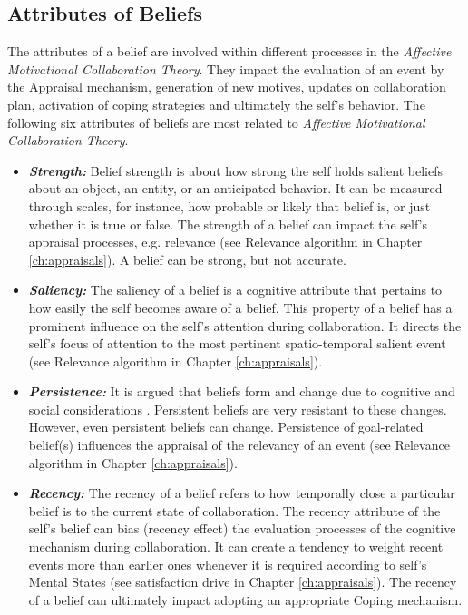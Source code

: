 \documentclass[12pt]{report}
\begin{document}
\subsection{Attributes of Beliefs}

The attributes of a belief are involved within different processes in the
\textit{Affective Motivational Collaboration Theory}. They impact the evaluation
of an event by the Appraisal mechanism, generation of new motives, updates on
collaboration plan, activation of coping strategies and ultimately the self's
behavior. The following six attributes of beliefs are most related to
\textit{Affective Motivational Collaboration Theory}.

\begin{itemize}
  \item \textbf{\textit{Strength:}} Belief strength is about how strong the self
  holds salient beliefs about an object, an entity, or an anticipated behavior.
  It can be measured through scales, for instance, how probable or likely that
  belief is, or just whether it is true or false. The strength of a belief can
  impact the self's appraisal processes, e.g. relevance (see Relevance algorithm
  in Chapter \ref{ch:appraisals}). A belief can be strong, but not accurate.
  
  \item \textbf{\textit{Saliency:}} The saliency of a belief is a cognitive
  attribute that pertains to how easily the self becomes aware of a belief.
  This property of a belief has a prominent influence on the self's attention
  during collaboration. It directs the self's focus of attention to the most
  pertinent spatio-temporal salient event (see Relevance algorithm in Chapter
  \ref{ch:appraisals}).
  
  \item \textbf{\textit{Persistence:}} It is argued that beliefs form and change
  due to cognitive and social considerations \cite{carley:belief-persistence}.
  Persistent beliefs are very resistant to these changes. However, even
  persistent beliefs can change. Persistence of goal-related belief(s)
  influences the appraisal of the relevancy of an event (see Relevance
  algorithm in Chapter \ref{ch:appraisals}).
  
  \item \textbf{\textit{Recency:}} The recency of a belief refers to how
  temporally close a particular belief is to the current state of collaboration.
  The recency attribute of the self's belief can bias (recency effect) the
  evaluation processes of the cognitive mechanism during collaboration. It can
  create a tendency to weight recent events more than earlier ones whenever it
  is required according to self's Mental States (see satisfaction drive in
  Chapter \ref{ch:appraisals}). The recency of a belief can ultimately impact
  adopting an appropriate Coping mechanism.
  

\end{itemize}
\end{document}
